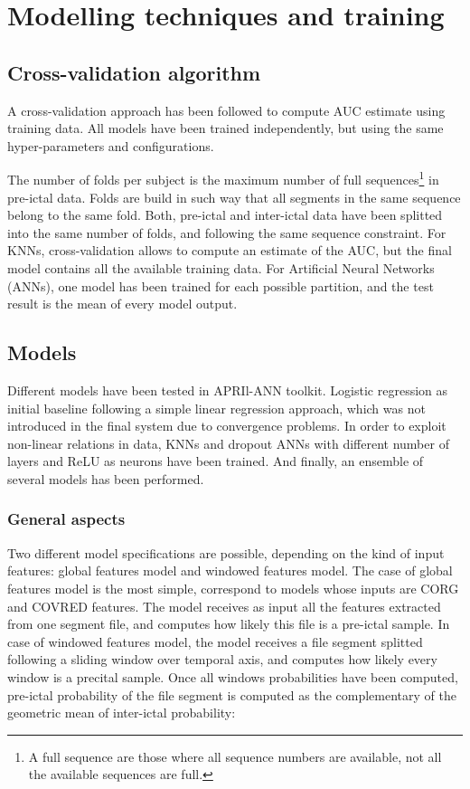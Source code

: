 \documentclass[a4paper,english,twoside]{article}
\begin{document}
\section{Modelling techniques and
  training}\label{modelling-techniques-and-training}

\subsection{Cross-validation
  algorithm}\label{cross-validation-algorithm}

A cross-validation approach has been followed to compute AUC estimate using
training data. All models have been trained independently, but using the same
hyper-parameters and configurations.

The number of folds per subject is the maximum number of full
sequences\footnote{A full sequence are those where all sequence numbers are
  available, not all the available sequences are full.} in pre-ictal data. Folds
are build in such way that all segments in the same sequence belong to the same
fold. Both, pre-ictal and inter-ictal data have been splitted into the same
number of folds, and following the same sequence constraint.  For KNNs,
cross-validation allows to compute an estimate of the AUC, but the final model
contains all the available training data.  For Artificial Neural Networks
(ANNs), one model has been trained for each possible partition, and the test
result is the mean of every model output.

\subsection{Models}\label{models}

Different models have been tested in APRIl-ANN toolkit. Logistic regression as
initial baseline following a simple linear regression approach, which was not
introduced in the final system due to convergence problems.  In order to exploit
non-linear relations in data, KNNs and dropout ANNs with different number of
layers and ReLU as neurons have been trained. And finally, an ensemble of
several models has been performed.

\subsubsection{General aspects}

Two different model specifications are possible, depending on the kind of input
features: global features model and windowed features model. The case of global
features model is the most simple, correspond to models whose inputs are CORG and
COVRED features. The model receives as input all the features extracted from
one segment file, and computes how likely this file is a pre-ictal sample. In
case of windowed features model, the model receives a file segment splitted
following a sliding window over temporal axis, and computes how likely every
window is a precital sample. Once all windows probabilities have been computed,
pre-ictal probability of the file segment is computed as the complementary of the
geometric mean of inter-ictal probability:
\end{document}
